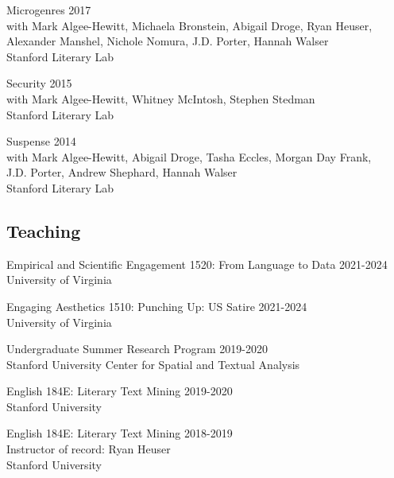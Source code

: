 \documentclass[
  12pt,
  letterpaper,
]{article}
\begin{document}
Microgenres \hfill 2017\\
\hspace*{0.333em} with Mark Algee-Hewitt, Michaela Bronstein, Abigail
Droge, Ryan Heuser,\\
\hspace*{0.333em} Alexander Manshel, Nichole Nomura, J.D. Porter, Hannah
Walser\\
\hspace*{0.333em} Stanford Literary Lab

Security \hfill 2015\\
\hspace*{0.333em} with Mark Algee-Hewitt, Whitney McIntosh, Stephen
Stedman\\
\hspace*{0.333em} Stanford Literary Lab

Suspense \hfill 2014\\
\hspace*{0.333em} with Mark Algee-Hewitt, Abigail Droge, Tasha Eccles,
Morgan Day Frank,\\
\hspace*{0.333em} J.D. Porter, Andrew Shephard, Hannah Walser\\
\hspace*{0.333em} Stanford Literary Lab

\hypertarget{teaching}{%
\subsection{Teaching}\label{teaching}}

Empirical and Scientific Engagement 1520: From Language to Data
\hfill 2021-2024\\
\hspace*{0.333em} University of Virginia

Engaging Aesthetics 1510: Punching Up: US Satire \hfill 2021-2024\\
\hspace*{0.333em} University of Virginia

Undergraduate Summer Research Program \hfill 2019-2020\\
\hspace*{0.333em} Stanford University Center for Spatial and Textual
Analysis

English 184E: Literary Text Mining \hfill 2019-2020\\
\hspace*{0.333em} Stanford University

English 184E: Literary Text Mining \hfill 2018-2019\\
\hspace*{0.333em} Instructor of record: Ryan Heuser\\
\hspace*{0.333em} Stanford University
\end{document}

